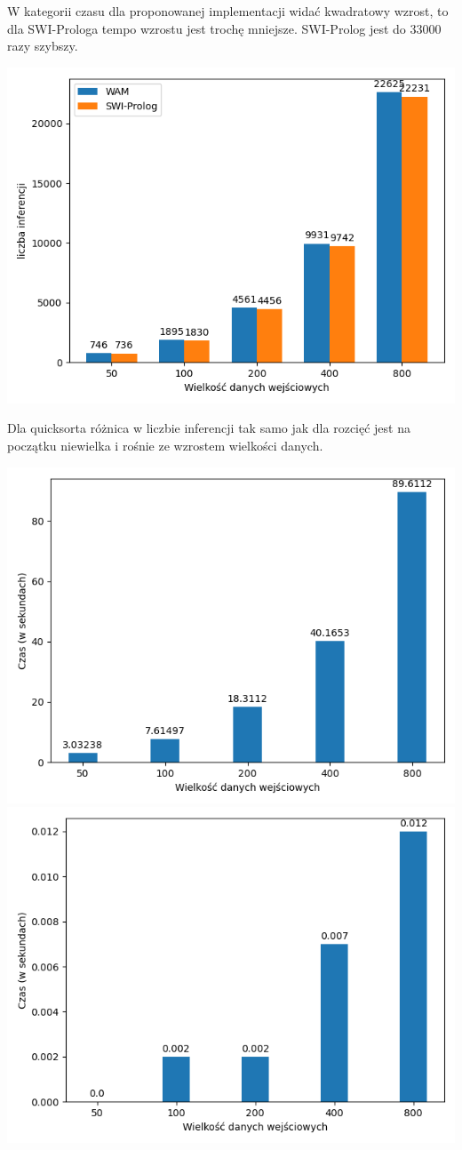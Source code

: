 W kategorii czasu dla proponowanej implementacji widać kwadratowy wzrost, to dla SWI-Prologa tempo wzrostu jest trochę mniejsze. SWI-Prolog jest do 33000 razy szybszy.

\includegraphics{qsorti.png}

Dla quicksorta różnica w liczbie inferencji tak samo jak dla rozcięć jest na początku niewielka i rośnie ze wzrostem wielkości danych.

\includegraphics{qsorttw.png}
\includegraphics{qsortts.png}

